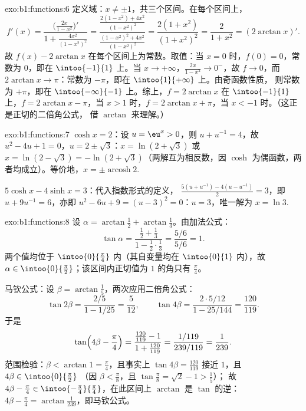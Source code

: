 \begin{solution}{exo:b1:functions:6}
定义域：$x \neq \pm 1$，共三个区间。在每个区间上，
\[
f'(x) = \frac{\bigl(\frac{2x}{1-x^2}\bigr)'}{1 +
\frac{4x^2}{(1-x^2)^2}}
= \frac{\frac{2(1-x^2) + 4x^2}{(1-x^2)^2}}
{\frac{(1-x^2)^2 + 4x^2}{(1-x^2)^2}}
= \frac{2(1 + x^2)}{(1 + x^2)^2} = \frac{2}{1 + x^2}
= (2\arctan x)' .
\]
故 $f(x) - 2\arctan x$ 在每个区间上为常数。取值：当 $x =
0$ 时，$f(0) = 0$，常数为 $0$，即在 $\intoo{-1}{1}$ 上。当 $x \to
+\infty$，$\frac{2x}{1-x^2} \to 0^-$，故 $f \to 0$，而 $2\arctan x
\to \pi$：常数为 $-\pi$，即在 $\intoo{1}{+\infty}$ 上。由奇函数性质，
则常数为 $+\pi$，即在 $\intoo{-\infty}{-1}$ 上。综上，$f = 2\arctan x$ 在
$\intoo{-1}{1}$ 上，$f = 2\arctan x - \pi$，当 $x > 1$ 时，$f = 2\arctan x +
\pi$，当 $x < -1$ 时。（这正是正切的二倍角公式，
借 $\arctan$ 来理解。）
\end{solution}

\begin{solution}{exo:b1:functions:7}
$\cosh x = 2$：设 $u = \eu^x > 0$，则 $u + u^{-1} = 4$，故 $u^2 - 4u +
1 = 0$，$u = 2 \pm \sqrt 3$：$x = \ln(2 + \sqrt 3)$ 或 $x = \ln(2 -
\sqrt 3) = -\ln(2 + \sqrt 3)$（两解互为相反数，因
$\cosh$ 为偶函数，两者均成立）。等价地，$x = \pm
\operatorname{arcosh} 2$.

$5\cosh x - 4\sinh x = 3$：代入指数形式的定义，
$\frac{5(u + u^{-1}) - 4(u - u^{-1})}{2} = 3$，即 $u + 9u^{-1} =
6$，亦即 $u^2 - 6u + 9 = (u - 3)^2 = 0$：$u = 3$，唯一解为 $x =
\ln 3$.
\end{solution}

\begin{solution}{exo:b1:functions:8}
设 $\alpha = \arctan\frac12 + \arctan\frac13$。由加法公式：
\[
\tan\alpha = \frac{\frac12 + \frac13}{1 - \frac12\cdot\frac13}
= \frac{5/6}{5/6} = 1 .
\]
两个值均位于 $\intoo{0}{\frac\pi4}$ 内（其自变量均在
$\intoo{0}{1}$ 内），故 $\alpha \in \intoo{0}{\frac\pi2}$；该区间内正切值为
$1$ 的角只有 $\frac\pi4$。

马钦公式：设 $\beta = \arctan\frac15$，两次应用二倍角公式：
\[
\tan 2\beta = \frac{2/5}{1 - 1/25} = \frac{5}{12},
\qquad
\tan 4\beta = \frac{2 \cdot 5/12}{1 - 25/144} = \frac{120}{119}.
\]
于是
\[
\tan\Bigl(4\beta - \frac\pi4\Bigr)
= \frac{\frac{120}{119} - 1}{1 + \frac{120}{119}}
= \frac{1/119}{239/119} = \frac{1}{239}.
\]
范围检验：$\beta < \arctan 1 = \frac\pi4$，且事实上 $\tan 4\beta =
\frac{120}{119}$ 接近 $1$，且 $4\beta \in \intoo{0}{\frac\pi2}$
（因 $\beta < \frac\pi8$，且 $\tan\frac\pi8 = \sqrt 2 - 1 > \frac15$）；
故 $4\beta - \frac\pi4 \in \intoo{-\frac\pi4}{\frac\pi4}$，在此区间上
$\arctan$ 是 $\tan$ 的逆：$4\beta - \frac\pi4 =
\arctan\frac{1}{239}$，即马钦公式。
\end{solution}

